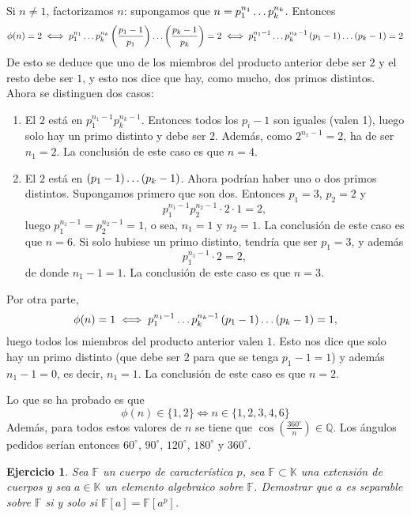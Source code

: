 \documentclass[11pt]{report}
\makeatletter
\renewenvironment{proof}[1][\proofname]{\par
  \pushQED{\qed}%
  \normalfont \topsep\z@skip %
  \trivlist
  \item[\hskip\labelsep
        \itshape
    #1\@addpunct{.}]\ignorespaces
}{%
  \popQED\endtrivlist\@endpefalse
}
\newcommand{\Q}{\mathbb Q}
\newcommand{\F}{\mathbb F}
\newcommand{\K}{\mathbb K}
\newtheorem{ejercicio}{Ejercicio}
\makeatother
\begin{document}
\begin{proof}
    Si $n \neq 1$, factorizamos $n$: supongamos que $n = p_1^{n_1}\mathellipsis p_k^{n_k}$. Entonces
    \[\phi(n) = 2 \iff p_1^{n_1}\mathellipsis p_k^{n_k}\left(\frac{p_1-1}{p_1}\right)\mathellipsis\left(\frac{p_k-1}{p_k}\right) = 2 \iff p_1^{n_1-1}\mathellipsis p_k^{n_k-1}\left(p_1-1\right)\mathellipsis\left(p_k-1\right)=2\]
    De esto se deduce que uno de los miembros del producto anterior debe ser $2$ y el resto debe ser $1$, y esto nos dice que hay, como mucho, dos primos distintos. Ahora se distinguen dos casos:
    \begin{enumerate}
        \item El $2$ está en $ p_1^{n_1-1}p_k^{n_k-1}$. Entonces todos los $p_i-1$ son iguales (valen 1), luego solo hay un primo distinto y debe ser $2$. Además, como $2^{n_1-1} = 2$, ha de ser $n_1 = 2$. La conclusión de este caso es que $n = 4$.
        \item El $2$ está en $\left(p_1-1\right)\mathellipsis\left(p_k-1\right)$. Ahora podrían haber uno o dos primos distintos. Supongamos primero que son dos. Entonces $p_1 = 3$, $p_2 = 2$ y
        \[p_1^{n_1-1}p_2^{n_2-1} \cdot 2 \cdot 1 = 2,\]
        luego $p_1^{n_1-1}=p_2^{n_2-1}=1$, o sea, $n_1=1$ y $n_2=1$. La conclusión de este caso es que $n = 6$. Si solo hubiese un primo distinto, tendría que ser $p_1 = 3$, y además
        \[p_1^{n_1-1} \cdot 2 = 2,\]
        de donde $n_1-1 = 1$. La conclusión de este caso es que $n = 3$.
    \end{enumerate}
    Por otra parte, 
    \[\phi(n) = 1 \iff p_1^{n_1-1}\mathellipsis p_k^{n_k-1}\left(p_1-1\right)\mathellipsis\left(p_k-1\right)=1,\]
    luego todos los miembros del producto anterior valen $1$. Esto nos dice que solo hay un primo distinto (que debe ser $2$ para que se tenga $p_1-1 = 1$) y además $n_1-1 = 0$, es decir, $n_1=1$. La conclusión de este caso es que $ n = 2$.
    
    Lo que se ha probado es que
    \[\phi(n) \in \{1,2\} \iff n \in \{1,2,3,4,6\}\]
    Además, para todos estos valores de $n$ se tiene que $\cos(\frac{360^\circ}{n}) \in \Q$. Los ángulos pedidos serían entonces $60^\circ$, $90^\circ$, $120^\circ$, $180^\circ$ y $360^\circ$.
    \end{proof}

    \begin{ejercicio}
        Sea $\F$ un cuerpo de característica $p$, sea $\F \subset \K$ una extensión de cuerpos y sea $a \in \K$ un elemento algebraico sobre $\F$. Demostrar que $a$ es separable sobre $\F$ si y solo si $\F[a] = \F[a^p]$.
        \end{ejercicio}
        
\end{document}
